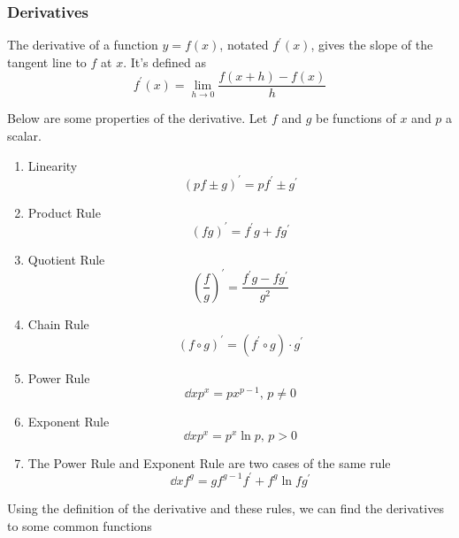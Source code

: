 \subsubsection{Derivatives}
The derivative of a function $y = f(x)$, notated $f^\prime(x)$, gives the slope of the tangent line to $f$ at $x$. It's defined as
\begin{equation*}
f^\prime(x) = \lim\limits_{h \to 0}{\frac{f(x+h) - f(x)}{h}}
\end{equation*}

\noindent
Below are some properties of the derivative. Let $f$ and $g$ be functions of $x$ and $p$ a scalar.
\begin{enumerate}[]
	\item Linearity
	\begin{equation*}
	\left( pf \pm g \right)^\prime = pf^\prime \pm g^\prime
	\end{equation*}
	\item Product Rule
	\begin{equation*}
	\left( fg \right)^\prime = f^\prime g + f g^\prime
	\end{equation*}
	\item Quotient Rule
	\begin{equation*}
	\left( \frac{f}{g} \right)^\prime = \frac{f^\prime g - f g^\prime}{g^2}
	\end{equation*}
	\item Chain Rule
	\begin{equation*}
	\left( f \circ g \right)^\prime = \left( f^\prime \circ g \right) \cdot g^\prime
	\end{equation*}
	\item Power Rule
	\begin{equation*}
	\dd{x} p^x = px^{p-1} \text{, } p \neq 0
	\end{equation*}
	\item Exponent Rule
	\begin{equation*}
	\dd{x} p^x = p^x \ln{p} \text{, } p > 0
	\end{equation*}
	\item The Power Rule and Exponent Rule are two cases of the same rule
	\begin{equation*}
	\dd{x} f^g = gf^{g-1}f^\prime + f^g\ln{f}g^\prime
	\end{equation*}
\end{enumerate}
Using the definition of the derivative and these rules, we can find the derivatives to some common functions
